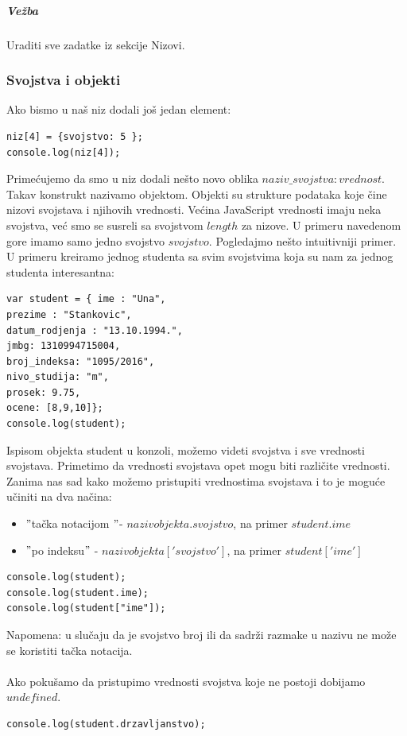 \documentclass[a4paper]{article}
\begin{document}
\subparagraph{Vežba}
Uraditi sve zadatke iz sekcije Nizovi.

\subsubsection{Svojstva i objekti}

Ako bismo u naš niz dodali još jedan element:
\begin{lstlisting}[backgroundcolor = \color{lightgray}]
niz[4] = {svojstvo: 5 };
console.log(niz[4]);			
\end{lstlisting}
Primećujemo da smo u niz dodali nešto novo oblika ${naziv\_svojstva : vrednost }$. Takav konstrukt nazivamo objektom. Objekti su strukture podataka koje čine nizovi svojstava i njihovih vrednosti. Većina JavaScript vrednosti imaju neka svojstva, već smo se susreli sa svojstvom $length$ za nizove. U primeru navedenom gore imamo samo jedno svojstvo $svojstvo$. Pogledajmo nešto intuitivniji primer. U primeru kreiramo jednog studenta sa svim svojstvima koja su nam za jednog studenta interesantna:
\begin{lstlisting}[backgroundcolor = \color{lightgray}]
var student = { ime : "Una",
prezime : "Stankovic",
datum_rodjenja : "13.10.1994.",
jmbg: 1310994715004,
broj_indeksa: "1095/2016",
nivo_studija: "m",
prosek: 9.75,
ocene: [8,9,10]};
console.log(student);
\end{lstlisting}
Ispisom objekta student u konzoli, možemo videti svojstva i sve vrednosti svojstava. Primetimo da vrednosti svojstava opet mogu biti različite vrednosti.\\
Zanima nas sad kako možemo pristupiti vrednostima svojstava i to je moguće učiniti na dva načina:
\begin{itemize}
	\item $"$tačka notacijom $"$- $nazivobjekta.svojstvo$, na primer $student.ime$
	\item $"$po indeksu$"$ - $nazivobjekta['svojstvo']$, na primer $student['ime']$
\end{itemize}
\begin{lstlisting}[backgroundcolor = \color{lightgray}]
console.log(student);
console.log(student.ime);
console.log(student["ime"]);
\end{lstlisting}
Napomena: u slučaju da je svojstvo broj ili da sadrži razmake u nazivu ne može se koristiti tačka notacija.\\\\
Ako pokušamo da pristupimo vrednosti svojstva koje ne postoji dobijamo $undefined$.
\begin{lstlisting}[backgroundcolor = \color{lightgray}]
console.log(student.drzavljanstvo);
\end{lstlisting}
\end{document}
